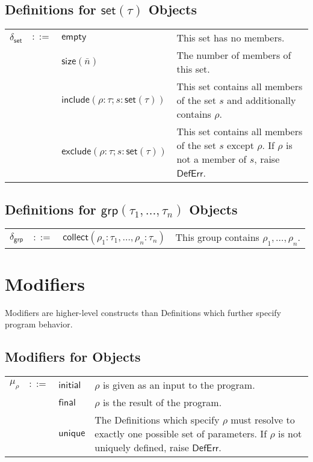 \documentclass[11pt]{report}
\begin{document}
\subsection{Definitions for $\mathsf{set}(\tau)$ Objects}
\label{subsec:def-set}

\begin{tabularx}{\textwidth}{l l l X}
$\delta_{\mathsf{set}}$ & $::=$ & $\mathsf{empty}$ & This set has no members. \\
 & & $\mathsf{size}(\bar{n})$ & The number of members of this set. \\
 & & $\mathsf{include}(\rho : \tau; s : \mathsf{set}(\tau))$ & This set contains all members of the set $s$ and additionally contains $\rho$. \\
 & & $\mathsf{exclude}(\rho : \tau; s : \mathsf{set}(\tau))$ & This set contains all members of the set $s$ except $\rho$. If $\rho$ is not a member of $s$, raise $\mathsf{DefErr}$.
\end{tabularx}

\subsection{Definitions for $\mathsf{grp}(\tau_1, \dots , \tau_n)$ Objects}
\label{subsec:def-grp}

\begin{tabularx}{\textwidth}{l l l X}
$\delta_{\mathsf{grp}}$ & $::=$ & $\mathsf{collect}(\rho_1 : \tau_1, \dots, \rho_n : \tau_n)$ & This group contains $\rho_1, \dots, \rho_n$.
\end{tabularx}


\section{Modifiers}
\label{sec:mods}

Modifiers are higher-level constructs than Definitions which further specify program behavior.

\subsection{Modifiers for Objects}
\label{subsec:mods-obj}

\begin{tabularx}{\textwidth}{l l l X}
$\mu_{\rho}$ & $::=$ & $\mathsf{initial}$ & $\rho$ is given as an input to the program. \\
 & & $\mathsf{final}$ & $\rho$ is the result of the program. \\
 & & $\mathsf{unique}$ & The Definitions which specify $\rho$ must resolve to exactly one possible set of parameters. If $\rho$ is not uniquely defined, raise $\mathsf{DefErr}$.
\end{tabularx}
\end{document}
